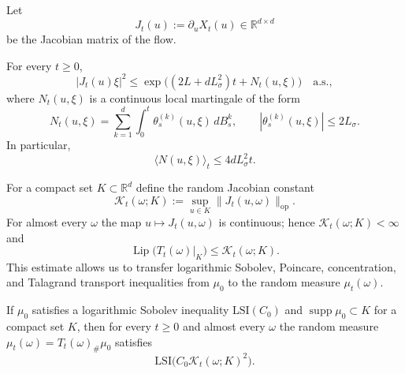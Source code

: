 \documentclass[12pt]{article}
\begin{document}
Let
\begin{equation}
    J_t(u):=\partial_uX_t(u)\in\mathbb R^{d\times d}
\end{equation}
be the Jacobian matrix of the flow.





\begin{proposition}
    For every $t\ge0$,
    \begin{equation}
        |J_t(u)\xi|^2\le
        \exp\Big((2L+dL_\sigma^2)t+N_t(u,\xi)\Big)
        \quad \text{a.s.},
        \label{eq:pathwise-summary}
    \end{equation}
    where $N_t(u,\xi)$ is a continuous local martingale of the form
    \begin{equation}
        N_t(u,\xi)=\sum_{k=1}^d\int_0^t\theta_s^{(k)}(u,\xi)\,dB_s^k,
        \qquad |\theta_s^{(k)}(u,\xi)|\le 2L_\sigma .
    \end{equation}
    In particular,
    \begin{equation}
        \langle N(u,\xi)\rangle_t\le 4dL_\sigma^2t .
    \end{equation}
\end{proposition}



For a compact set $K\subset\mathbb R^d$ define the random Jacobian constant
\begin{equation}
    \mathcal K_t(\omega;K):=
    \sup_{u\in K}\|J_t(u,\omega)\|_{\mathrm{op}}.
\end{equation}
For almost every $\omega$ the map $u\mapsto J_t(u,\omega)$ is continuous;
hence $\mathcal K_t(\omega;K)<\infty$ and
\begin{equation}
    \operatorname{Lip}\bigl(T_t(\omega)|_K\bigr)
    \le \mathcal K_t(\omega;K).
\end{equation}
This estimate allows us to transfer logarithmic Sobolev, Poincare,
concentration, and Talagrand transport inequalities from $\mu_0$ to the random
measure $\mu_t(\omega)$.

\begin{corollary}
    If $\mu_0$ satisfies a logarithmic Sobolev inequality $\mathrm{LSI}(C_0)$ and
    $\operatorname{supp}\mu_0\subset K$ for a compact set $K$, then for every
    $t\ge0$ and almost every $\omega$ the random measure
    $\mu_t(\omega)=T_t(\omega)_{\#}\mu_0$ satisfies
    \begin{equation}
        \mathrm{LSI}\bigl(C_0\mathcal K_t(\omega;K)^2\bigr).
    \end{equation}
\end{corollary}
\end{document}
